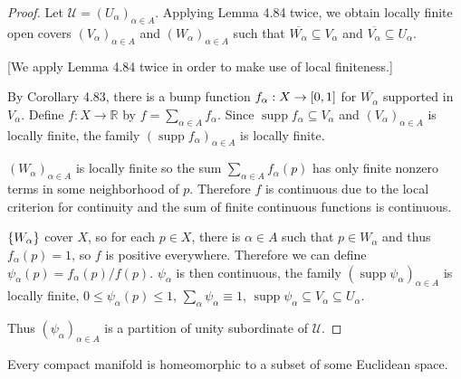 \begin{proof}
	Let $\mathscr{U} = {(U_{\alpha})}_{\alpha\in A}$. Applying Lemma 4.84 twice, we obtain locally finite open covers ${(V_{\alpha})}_{\alpha\in A}$ and ${(W_{\alpha})}_{\alpha\in A}$ such that $\overline{W_{\alpha}} \subseteq V_{\alpha}$ and $\overline{V_{\alpha}} \subseteq U_{\alpha}$.

		[We apply Lemma 4.84 twice in order to make use of local finiteness.]

	By Corollary 4.83, there is a bump function $f_{\alpha}: X \to \left[{0, 1}\right]$ for $\overline{W_{\alpha}}$ supported in $V_{\alpha}$. Define $f: X \to \mathbb{R}$ by $f = \sum_{\alpha\in A}f_{\alpha}$. Since $\operatorname{supp} f_{\alpha} \subseteq V_{\alpha}$ and ${(V_{\alpha})}_{\alpha\in A}$ is locally finite, the family ${(\operatorname{supp} f_{\alpha})}_{\alpha\in A}$ is locally finite.

	${(W_{\alpha})}_{\alpha\in A}$ is locally finite so the sum $\sum_{\alpha\in A}f_{\alpha}(p)$ has only finite nonzero terms in some neighborhood of $p$. Therefore $f$ is continuous due to the local criterion for continuity and the sum of finite continuous functions is continuous.

	$\left\{{W_{\alpha}}\right\}$ cover $X$, so for each $p\in X$, there is $\alpha\in A$ such that $p\in W_{\alpha}$ and thus $f_{\alpha}(p) = 1$, so $f$ is positive everywhere. Therefore we can define $\psi_{\alpha}(p) = f_{\alpha}(p) / f(p)$. $\psi_{\alpha}$ is then continuous, the family ${(\operatorname{supp} \psi_{\alpha})}_{\alpha\in A}$ is locally finite, $0 \leq \psi_{\alpha}(p) \leq 1$, $\sum_{\alpha}\psi_{\alpha} \equiv 1$, $\operatorname{supp} \psi_{\alpha} \subseteq V_{\alpha} \subseteq U_{\alpha}$.

	Thus ${(\psi_{\alpha})}_{\alpha\in A}$ is a partition of unity subordinate of $\mathscr{U}$.
\end{proof}

\begin{theorem}{4.86}\label{theorem:4.86}
	Every compact manifold is homeomorphic to a subset of some Euclidean space.
\end{theorem}

